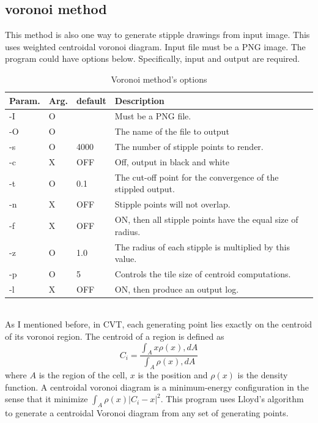 \documentclass[11pt]{article}
\begin{document}
\subsection{voronoi method}
This method is also one way to generate stipple drawings from input image. This uses weighted centroidal voronoi diagram. Input file must be a PNG image. The program could have options below. Specifically, input and output are required\cite{saliences}.
\begin{table}[hbt]
\centering
\begin{tabular}{|l||l|l|l|}  
\hline
Param. & Arg. & default & Description\\
\hline\hline
-I & O &  & Must be a PNG file.\\  
\hline
-O & O &  & The name of the file to output\\
\hline
-s & O & 4000 & The number of stipple points to render.\\
\hline
-c & X & OFF & Off, output in black and white\\
\hline
-t & O & 0.1 & The cut-off point for the convergence of the stippled output.\\
\hline
-n & X & OFF & Stipple points will not overlap.\\
\hline
-f & X & OFF & ON, then all stipple points have the equal size of radius.\\
\hline
-z & O & 1.0 & The radius of each stipple is multiplied by this value.\\
\hline
-p & O & 5 & Controls the tile size of centroid computations.\\
\hline
-l & X & OFF & ON, then produce an output log.\\
\hline
\end{tabular}
\caption{Voronoi method's options}
\label{voronoimethodoptions}
\end{table}
\\
As I mentioned before, in CVT, each generating point lies exactly on the centroid of its voronoi region. The centroid of a region is defined as 
\begin{equation}
C_i = \frac{\int_{A} x\rho(x), dA}{\int_{A} \rho(x), dA}
\label{eq:centroid}
\end{equation}
where $A$ is the region of the cell, $x$ is the position and $\rho(x)$ is the density function. A centroidal voronoi diagram is a minimum-energy configuration in the sense that it minimize $\int_{A}\rho(x){|C_i-x|}^2$.\cite{weighted-voronoi-stipples}
This program uses Lloyd's algorithm\cite{weighted-voronoi-stippling} to generate a centroidal Voronoi diagram from any set of generating points.
\end{document}
